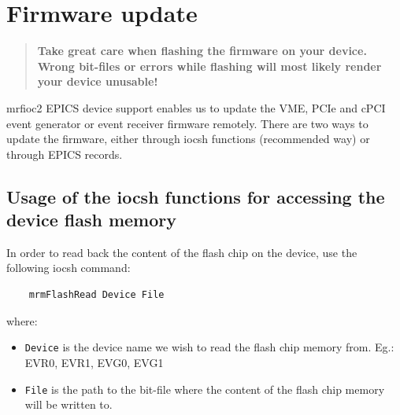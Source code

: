 \documentclass[12pt,a4paper]{article}
\let\stdsection\section
\renewcommand\section{\newpage\stdsection}
\begin{document}


\section{Firmware update}
\begin{quote}
\textbf{Take great care when flashing the firmware on your device. Wrong bit-files or errors while flashing will most likely render your device unusable!}
\end{quote}
mrfioc2 EPICS device support enables us to update the VME, PCIe and cPCI event generator or event receiver firmware remotely. There are two ways to update the firmware, either through iocsh functions (recommended way) or through EPICS records.


\subsection{Usage of the iocsh functions for accessing the device flash memory} \label{sec:firmware update:iocsh}
In order to read back the content of the flash chip on the device, use the following iocsh command:
\begin{verbatim}
	mrmFlashRead Device File
\end{verbatim}
where:
\begin{itemize}
	\item \texttt{Device} is the device name we wish to read the flash chip memory from. Eg.: EVR0, EVR1, EVG0, EVG1
	\item \texttt{File} is the path to the bit-file where the content of the flash chip memory will be written to.
\end{itemize}
\end{document}
